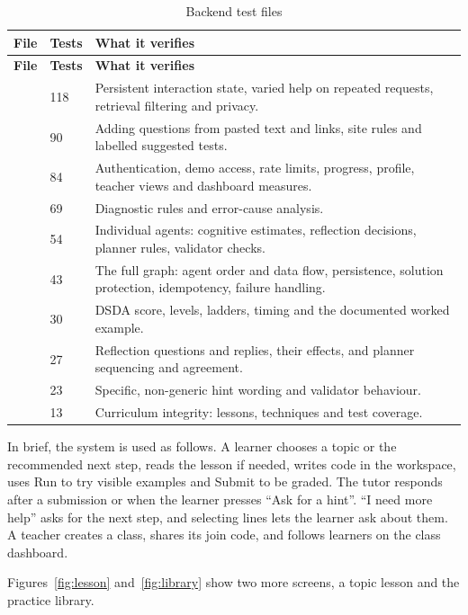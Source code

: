 \begingroup\small
\setlength{\tabcolsep}{4pt}\renewcommand{\arraystretch}{1.15}
\begin{longtable}{|R{4.6cm}|R{1.2cm}|R{7.8cm}|}
\caption{Backend test files}\label{tab:testfiles}\\\hline
\textbf{File} & \textbf{Tests} & \textbf{What it verifies}\\\hline\endfirsthead
\hline\textbf{File} & \textbf{Tests} & \textbf{What it verifies}\\\hline\endhead
{} & 118 & Persistent interaction state, varied help on repeated requests, retrieval filtering and privacy.\\\hline
{} & 90 & Adding questions from pasted text and links, site rules and labelled suggested tests.\\\hline
{} & 84 & Authentication, demo access, rate limits, progress, profile, teacher views and dashboard measures.\\\hline
{} & 69 & Diagnostic rules and error-cause analysis.\\\hline
{} & 54 & Individual agents: cognitive estimates, reflection decisions, planner rules, validator checks.\\\hline
{} & 43 & The full graph: agent order and data flow, persistence, solution protection, idempotency, failure handling.\\\hline
{} & 30 & DSDA score, levels, ladders, timing and the documented worked example.\\\hline
{} & 27 & Reflection questions and replies, their effects, and planner sequencing and agreement.\\\hline
{} & 23 & Specific, non-generic hint wording and validator behaviour.\\\hline
{} & 13 & Curriculum integrity: lessons, techniques and test coverage.\\\hline
\end{longtable}
\endgroup

In brief, the system is used as follows. A learner chooses a topic or the recommended next step, reads the lesson if needed, writes code in the workspace, uses Run to try visible examples and Submit to be graded. The tutor responds after a submission or when the learner presses ``Ask for a hint''. ``I need more help'' asks for the next step, and selecting lines lets the learner ask about them. A teacher creates a class, shares its join code, and follows learners on the class dashboard.

Figures~\ref{fig:lesson} and~\ref{fig:library} show two more screens, a topic lesson and the practice library.


